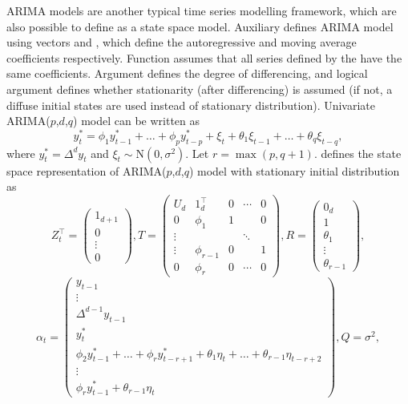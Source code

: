 \documentclass[nojss,article]{jss}\usepackage[]{graphicx}\usepackage[]{color}
\begin{document}
ARIMA models are another typical time series modelling framework, which are also possible to define as a state space model. Auxiliary  defines ARIMA model using vectors  and , which define the autoregressive and moving average coefficients respectively. Function assumes that all series defined by the  have the same coefficients. Argument  defines the degree of differencing, and logical argument  defines whether stationarity (after differencing) is assumed (if not, a diffuse initial states are used instead of stationary distribution). Univariate ARIMA($p$,$d$,$q$) model can be written as
\begin{equation*}
y^*_t = \phi_1 y^*_{t-1} + \ldots + \phi_p y^*_{t-p} + \xi_t + \theta_1 \xi_{t-1} + \ldots + \theta_q \xi_{t-q},
\end{equation*}
where $y^*_t = \Delta^d y_t$ and $\xi_t \sim \textrm{N}(0,\sigma^2)$. Let $r=\max(p,q+1)$.  defines the state space representation of ARIMA($p$,$d$,$q$) model with stationary initial distribution as
\begin{displaymath}
Z_t^\top =
\left( \begin{array}{c}
1_{d+1} \\
0 \\
\vdots \\
0
\end{array}\right),
T =
\left( \begin{array}{ccccc}
U_d & 1^\top_d & 0 & \cdots & 0\\
0 &\phi_1 & 1 & & 0 \\
\vdots &  &  & \ddots &  \\
\vdots & \phi_{r-1} & 0 &  & 1 \\
0 & \phi_{r} & 0 & \cdots & 0
\end{array} \right),
R =
\left( \begin{array}{c}
0_{d} \\
1 \\
\theta_1 \\
\vdots \\
\theta_{r-1}
\end{array}\right),
\end{displaymath}
\begin{displaymath}
\alpha_t =
\left( \begin{array}{c}
y_{t-1} \\
\vdots \\
\Delta^{d-1} y_{t-1}\\
y^*_t \\
\phi_2 y^*_{t-1} + \ldots + \phi_r y^*_{t-r+1} + \theta_1\eta_t+\ldots+\theta_{r-1}\eta_{t-r+2} \\
\vdots \\
\phi_r y^*_{t-1} + \theta_{r-1}\eta_t
\end{array}\right),
Q=\sigma^2,
\end{displaymath}
\end{document}
